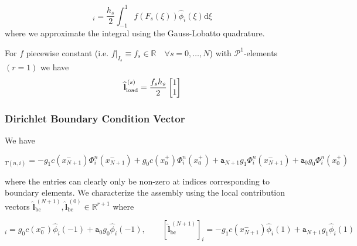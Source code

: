\begin{equation*} 
    [\widehat{\textbf{l}}_{\text{load}}^{\,(s)}]_{i} 
    = \frac{h_s}{2} \int_{-1}^{1} f(F_s(\xi))\widehat{\phi}_i(\xi)\text{d}\xi
\end{equation*}
where we approximate the integral using the Gauss-Lobatto quadrature.

\begin{example}
    For $f$ piecewise constant (i.e. $f|_{I_s} \equiv f_s \in \mathbb{R} \quad \forall s=0,\ldots,N$) with $\mathcal{P}^1$-elements $(r=1)$ we have
    \begin{equation*}
        \normalfont \widehat{\textbf{l}}_{\text{load}}^{\,(s)} = \frac{f_s h_s}{2}
        \begin{bmatrix}
            1 \\
            1
        \end{bmatrix}
    \end{equation*}
\end{example}

\subsubsection{Dirichlet Boundary Condition Vector}
We have 

\begin{equation*}
    [\textbf{l}_{\text{bc}}]_{T(n,i)} = 
    -g_1c(x_{N+1}^-)\Phi_i^n(x_{N+1}^-) + g_0c(x_0^+)\Phi_i^n(x_0^+)
    + \texttt{a}_{N+1}g_1\Phi_i^n(x_{N+1}^-) + \texttt{a}_0 g_0\Phi_i^n(x_{0}^+)
\end{equation*}

where the entries can clearly only be non-zero at indices corresponding to 
boundary elements.
We characterize the assembly using the local contribution vectors 
$\widehat{\textbf{l}}_{\text{bc}}^{\,(N+1)}, \widehat{\textbf{l}}_{\text{bc}}^{\,(0)} \in \mathbb{R}^{r+1}$
where

\begin{equation*}
     [\widehat{\textbf{l}}_{\text{bc}}^{\,(0)}]_{i} = g_0c(x_{0}^-) \widehat{\phi}_i(-1) + \texttt{a}_{0}g_0\widehat{\phi}_i(-1), \qquad
     [\widehat{\textbf{l}}_{\text{bc}}^{\,(N+1)}]_{i} = -g_1c(x_{N+1}^-) \widehat{\phi}_i(1) + \texttt{a}_{N+1}g_1\widehat{\phi}_i(1)
\end{equation*}

